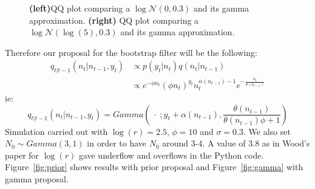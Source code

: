 \documentclass{article}
\begin{document}
\begin{figure}[htb]
\begin{minipage}{.45\textwidth}
	\end{minipage}
	\caption{\textbf{(left)}QQ plot comparing a $\log\mathcal{N}(0, 0.3)$ and its gamma approximation. \textbf{(right)} QQ plot comparing a $\log\mathcal{N}(\log(5), 0.3)$ and its gamma approximation.}
	\label{fig:approx}
\end{figure}

Therefore our proposal for the bootstrap filter will be the following:
\begin{equation*}
\begin{split}
q_{t|t-1}(n_t|n_{t-1}, y_t) & \propto  p(y_t|n_t)q(n_t|n_{t-1}) \\
& \propto e^{-\phi n_t}(\phi n_t)^{y_t}n_t^{\alpha(n_{t-1})-1}e^{-\frac{n_t}{\theta(n_{t-1})}}
\end{split}
\end{equation*}
ie:
\begin{equation*}
q_{t|t-1}(n_t|n_{t-1}, y_t) = Gamma(\ \cdot \ ; y_t+\alpha(n_{t-1}), \frac{\theta(n_{t-1})}{\theta(n_{t-1})\phi + 1})\end{equation*}
Simulation carried out with $\log(r)=2.5$, $\phi=10$ and $\sigma=0.3$. We also set $N_0 \sim Gamma(3,1)$ in order to have $N_0$ around 3-4. A value of 3.8 as in Wood's paper for $\log(r)$ gave underflow and overflows in the Python code. Figure~\ref{fig:prior} shows results with prior proposal and Figure~\ref{fig:gamma} with gamma proposal.
\end{document}
